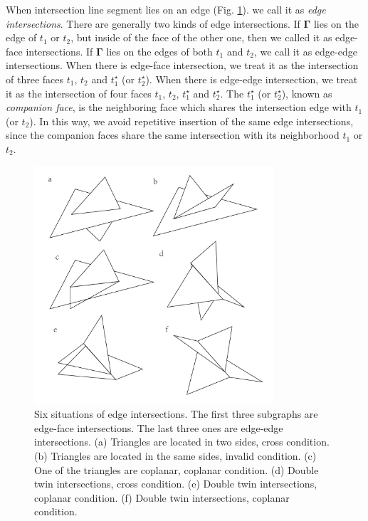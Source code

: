 \documentclass[10pt,journal,compsoc]{IEEEtran}
\begin{document}
When intersection line segment lies on an edge (Fig. \ref{fig:twin}). we call it as \emph{edge intersections}. There are generally two kinds of edge intersections. If ${\boldsymbol{\Gamma}}$ lies on the edge of $t_1$ or $t_2$, but inside of the face of the other one, then we called it as edge-face intersections. If ${\boldsymbol{\Gamma}}$ lies on the edges of both $t_1$ and $t_2$, we call it as edge-edge intersections. When there is edge-face intersection, we treat it as the intersection of three faces $t_1$, $t_2$ and $t_1^\star$ (or $t_2^\star$). When there is edge-edge intersection, we treat it as the intersection of four faces $t_1$, $t_2$, $t_1^\star$ and $t_2^\star$. The $t_1^\star$ (or $t_2^\star$), known as \emph{companion face},  is the neighboring face which shares the intersection edge with $t_1$ (or $t_2$). In this way, we avoid repetitive insertion of the same edge intersections, since the companion faces share the same intersection with its neighborhood $t_1$ or $t_2$.

\begin{figure}[t]
\centering
\includegraphics[width=3.5in]{twin}
\caption{Six situations of edge intersections. The first three subgraphs are edge-face intersections. The last three ones are edge-edge intersections. (a) Triangles are located in two sides, cross condition. (b) Triangles are located in the same sides, invalid condition. (c) One of the triangles are coplanar, coplanar condition. (d) Double twin intersections, cross condition. (e) Double twin intersections, coplanar condition. (f) Double twin intersections, coplanar condition.}
\label{fig:twin}
\end{figure}
\end{document}

